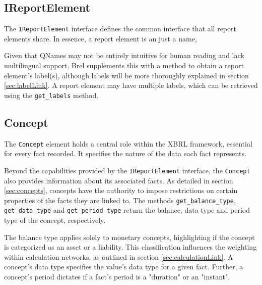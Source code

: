\subsection{IReportElement}

The \texttt{IReportElement} interface defines the common interface that all report elements share.
In essence, a report element is an just a name, 

Given that QNames may not be entirely intuitive for human reading and lack multilingual support, 
Brel supplements this with a method to obtain a report element's label(s), 
although labels will be more thoroughly explained in section \ref{sec:labelLink}. 
A report element may have multiple labels, which can be retrieved using the \texttt{get\_labels} method.

\subsection{Concept}

The \texttt{Concept} element holds a central role within the XBRL framework, essential for every fact recorded. 
It specifies the nature of the data each fact represents.

Beyond the capabilities provided by the \texttt{IReportElement} interface,
the \texttt{Concept} also provides information about its associated facts.
As detailed in section \ref{sec:concepts}, concepts have the authority to impose restrictions on certain properties of the facts they are linked to.
The methods \texttt{get\_balance\_type}, \texttt{get\_data\_type} and \texttt{get\_period\_type} return the balance, 
data type and period type of the concept, respectively.

The balance type applies solely to monetary concepts,
highlighting if the concept is categorized as an asset or a liability.
This classification influences the weighting within calculation networks, as outlined in section \ref{sec:calculationLink}.
A concept's data type specifies the value's data type for a given fact.
Further, a concept's period dictates if a fact's period is a "duration" or an "instant".

